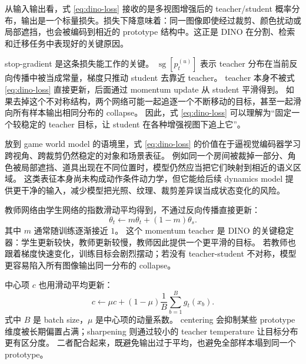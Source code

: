 \documentclass[11pt,a4paper]{ctexart}
\begin{document}
从输入输出看，式 \eqref{eq:dino-loss} 接收的是多视图增强后的 teacher/student 概率分布，输出是一个标量损失。损失下降意味着：同一图像即使经过裁剪、颜色扰动或局部遮挡，也会被编码到相近的 prototype 结构中。这正是 DINO 在分割、检索和迁移任务中表现好的关键原因。

stop-gradient 是这条损失能工作的关键。
$\operatorname{sg}[p_t^{(u)}]$ 表示 teacher 分布在当前反向传播中被当成常量，梯度只推动 student 去靠近 teacher。
teacher 本身不被式 \eqref{eq:dino-loss} 直接更新，后面通过 momentum update 从 student 平滑得到。
如果去掉这个不对称结构，两个网络可能一起追逐一个不断移动的目标，甚至一起滑向所有样本输出相同分布的 collapse。
因此，式 \eqref{eq:dino-loss} 可以理解为“固定一个较稳定的 teacher 目标，让 student 在各种增强视图下追上它”。

放到 game world model 的语境里，式 \eqref{eq:dino-loss} 的价值在于逼视觉编码器学习跨视角、跨裁剪仍然稳定的对象和场景表征。
例如同一个房间被裁掉一部分、角色被局部遮挡、道具出现在不同位置时，模型仍然应当把它们映射到相近的语义区域。
这类表征本身尚未构成动作条件动力学，但它能给后续 dynamics model 提供更干净的输入，减少模型把光照、纹理、裁剪差异误当成状态变化的风险。

教师网络由学生网络的指数滑动平均得到，不通过反向传播直接更新：
\begin{equation}
  \theta_t \leftarrow m\theta_t + (1-m)\theta_s .
\end{equation}
其中 $m$ 通常随训练逐渐接近 $1$。
这个 momentum teacher 是 DINO 的关键稳定器：学生更新较快，教师更新较慢，教师因此提供一个更平滑的目标。
若教师也跟着梯度快速变化，训练目标会剧烈摆动；若没有 teacher-student 不对称，模型更容易陷入所有图像输出同一分布的 collapse。

中心项 $c$ 也用滑动平均更新：
\begin{equation}
  c \leftarrow \mu c + (1-\mu)\frac{1}{B}\sum_{b=1}^{B} g_t(x_b).
\end{equation}
式中 $B$ 是 batch size，$\mu$ 是中心项的动量系数。
centering 会抑制某些 prototype 维度被长期偏置占满；sharpening 则通过较小的 teacher temperature 让目标分布更有区分度。
二者配合起来，既避免输出过于平均，也避免全部样本塌到同一个 prototype。
\end{document}
